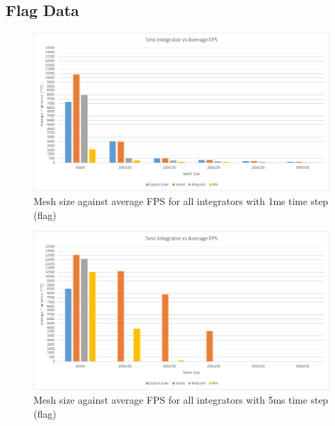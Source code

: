 \begin{landscape}
\subsection{Flag Data}

    \begin{figure}[!htb]
    \begin{center}
      \includegraphics[scale=0.95]{Figures/flag_1ms_int_fps}
    \end{center}
    \caption{Mesh size against average FPS for all integrators with 1ms time step (flag)}
    \label{fig:1ms fps flag}
  \end{figure}
  
    \begin{figure}[!htb]
    \begin{center}
      \includegraphics{Figures/flag_5ms_int_fps}
    \end{center}
    \caption{Mesh size against average FPS for all integrators with 5ms time step (flag)}
    \label{fig:5ms fps flag}
  \end{figure}
  

\end{landscape}
